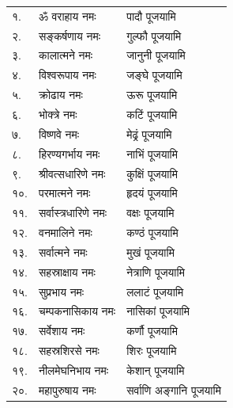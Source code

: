 \begin{longtable}{ll@{— }l}
१.& ॐ वराहाय नमः & पादौ पूजयामि\\
२.& सङ्कर्षणाय नमः & गुल्फौ पूजयामि\\
३.& कालात्मने नमः & जानुनी पूजयामि\\
४.& विश्वरूपाय नमः & जङ्घे पूजयामि\\
५.& क्रोढाय नमः & ऊरू पूजयामि\\
६.& भोक्त्रे नमः & कटिं पूजयामि\\
७.& विष्णवे नमः & मेढ्रं पूजयामि\\
८.& हिरण्यगर्भाय नमः & नाभिं पूजयामि\\
९.& श्रीवत्सधारिणे नमः & कुक्षिं पूजयामि\\
१०.& परमात्मने नमः & हृदयं पूजयामि\\
११.& सर्वास्त्रधारिणे नमः & वक्षः पूजयामि\\
१२.& वनमालिने नमः & कण्ठं पूजयामि\\
१३.& सर्वात्मने नमः & मुखं पूजयामि\\
१४.& सहस्राक्षाय नमः & नेत्राणि पूजयामि\\
१५.& सुप्रभाय नमः & ललाटं पूजयामि\\
१६.& चम्पकनासिकाय नमः & नासिकां पूजयामि\\
१७.& सर्वेशाय नमः & कर्णौ पूजयामि\\
१८.& सहस्रशिरसे नमः & शिरः पूजयामि\\
१९.& नीलमेघनिभाय नमः & केशान् पूजयामि\\
२०.& महापुरुषाय नमः & सर्वाणि अङ्गानि पूजयामि\\
\end{longtable}

